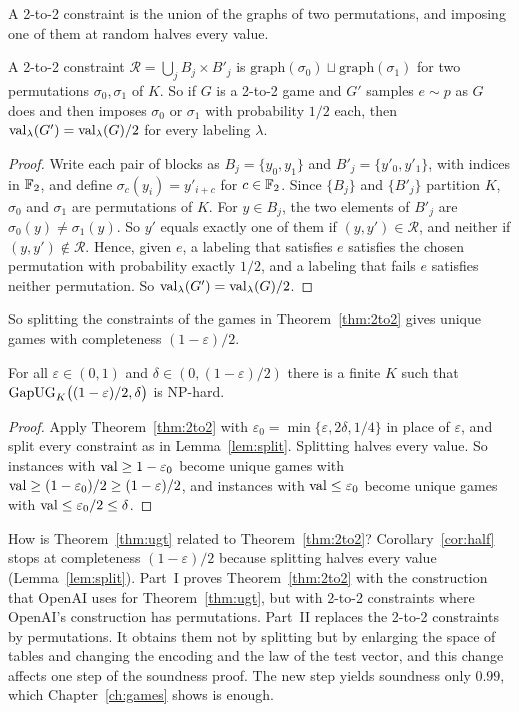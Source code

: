 A 2-to-2 constraint is the union of the graphs of two permutations, and imposing one of them at random halves every value.

\begin{lemma}\label{lem:split}
A 2-to-2 constraint $\mathcal R=\bigcup_jB_j\times B'_j$ is $\mathrm{graph}(\sigma_0)\sqcup\mathrm{graph}(\sigma_1)$ for two permutations $\sigma_0,\sigma_1$ of $K$. So if $G$ is a 2-to-2 game and $G'$ samples $e\sim p$ as $G$ does and then imposes $\sigma_0$ or $\sigma_1$ with probability $1/2$ each, then $\operatorname{val}_\lambda(G')=\operatorname{val}_\lambda(G)/2$ for every labeling $\lambda$.
\end{lemma}

\begin{proof}
Write each pair of blocks as $B_j=\{y_0,y_1\}$ and $B'_j=\{y'_0,y'_1\}$, with indices in $\mathbb{F}_2$, and define $\sigma_c(y_i)=y'_{i+c}$ for $c\in\mathbb{F}_2$. Since $\{B_j\}$ and $\{B'_j\}$ partition $K$, $\sigma_0$ and $\sigma_1$ are permutations of $K$. For $y\in B_j$, the two elements of $B'_j$ are $\sigma_0(y)\ne\sigma_1(y)$. So $y'$ equals exactly one of them if $(y,y')\in\mathcal R$, and neither if $(y,y')\notin\mathcal R$. Hence, given $e$, a labeling that satisfies $e$ satisfies the chosen permutation with probability exactly $1/2$, and a labeling that fails $e$ satisfies neither permutation. So $\operatorname{val}_\lambda(G')=\operatorname{val}_\lambda(G)/2$.
\end{proof}

So splitting the constraints of the games in Theorem~\ref{thm:2to2} gives unique games with completeness $(1-\varepsilon)/2$.

\begin{corollary}\label{cor:half}
For all $\varepsilon\in(0,1)$ and $\delta\in(0,(1-\varepsilon)/2)$ there is a finite $K$ such that $\mathrm{GapUG}_K\bigl((1-\varepsilon)/2,\delta\bigr)$ is NP-hard.
\end{corollary}

\begin{proof}
Apply Theorem~\ref{thm:2to2} with $\varepsilon_0=\min\{\varepsilon,2\delta,1/4\}$ in place of $\varepsilon$, and split every constraint as in Lemma~\ref{lem:split}. Splitting halves every value. So instances with $\operatorname{val}\ge1-\varepsilon_0$ become unique games with $\operatorname{val}\ge(1-\varepsilon_0)/2\ge(1-\varepsilon)/2$, and instances with $\operatorname{val}\le\varepsilon_0$ become unique games with $\operatorname{val}\le\varepsilon_0/2\le\delta$.
\end{proof}

How is Theorem~\ref{thm:ugt} related to Theorem~\ref{thm:2to2}? Corollary~\ref{cor:half} stops at completeness $(1-\varepsilon)/2$ because splitting halves every value (Lemma~\ref{lem:split}). Part~I proves Theorem~\ref{thm:2to2} with the construction that OpenAI uses for Theorem~\ref{thm:ugt}, but with 2-to-2 constraints where OpenAI's construction has permutations. Part~II replaces the 2-to-2 constraints by permutations. It obtains them not by splitting but by enlarging the space of tables and changing the encoding and the law of the test vector, and this change affects one step of the soundness proof. The new step yields soundness only $0.99$, which Chapter~\ref{ch:games} shows is enough.

